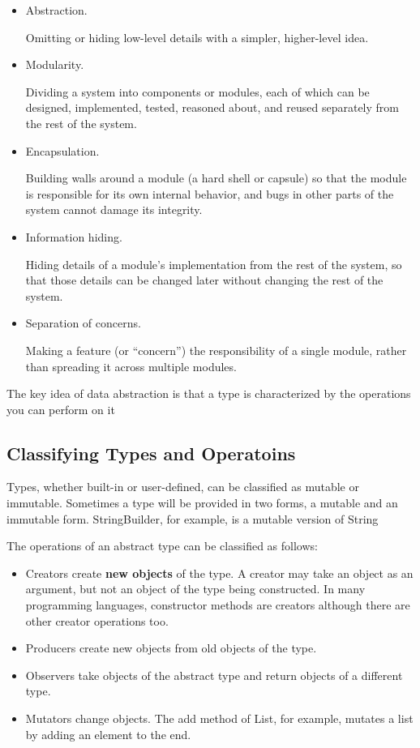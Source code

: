 \documentclass[letterpaper,12pt]{article}
\begin{document}
\begin{itemize}
      \item Abstraction.

            Omitting or hiding low-level details with a simpler, higher-level idea.
      \item Modularity.

            Dividing a system into components or modules, each of which can be designed,
            implemented, tested, reasoned about, and reused separately from the rest of the
            system.
      \item Encapsulation.

            Building walls around a module (a hard shell or capsule) so that the module is
            responsible for its own internal behavior, and bugs in other parts of the
            system cannot damage its integrity.
      \item Information hiding.

            Hiding details of a module's implementation from the rest of the system, so
            that those details can be changed later without changing the rest of the
            system.
      \item Separation of concerns.

            Making a feature (or ``concern'') the responsibility of a single module, rather
            than spreading it across multiple modules.
\end{itemize}

The key idea of data abstraction is that a type is characterized by the
operations you can perform on it

\subsection{Classifying Types and Operatoins}

Types, whether built-in or user-defined, can be classified as mutable or
immutable. Sometimes a type will be provided in two forms, a mutable and an
immutable form. StringBuilder, for example, is a mutable version of String

The operations of an abstract type can be classified as follows:

\begin{itemize}
      \item Creators create \textbf{new objects} of the type. A creator may take an object
            as an argument, but not an object of the type being constructed. In many
            programming languages, constructor methods are creators although there are
            other creator operations too.
      \item Producers create new objects from old objects of the type.
      \item Observers take objects of the abstract type and return objects of a different
            type.
      \item Mutators change objects. The add\(\) method of List, for example, mutates a
            list by adding an element to the end.
\end{itemize}
\end{document}
